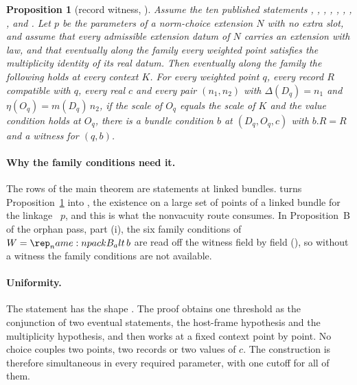 \documentclass[11pt]{article}
\newtheorem{proposition}[theorem]{Proposition}
\theoremstyle{remark}
\begin{document}
\begin{proposition}[record witness, ]\label{prop:bw}
Assume the ten published statements , , , , , , , ,  and . Let $p$ be the parameters of a norm-choice extension $N$ with no extra slot, and assume that every admissible extension datum of $N$ carries an extension with law, and that eventually along the family every weighted point satisfies the multiplicity identity  of its real datum. Then eventually along the family the following holds at every context $K$. For every weighted point $q$, every record $R$ compatible with $q$, every real $c$ and every pair $(n_1,n_2)$ with $\Delta(D_q)=n_1$ and $\eta(O_q)=m(D_q)\,n_2$, if the scale of $O_q$ equals the scale of $K$ and the value condition  holds at $O_q$, there is a bundle condition $b$ at $(D_q,O_q,c)$ with $b.R=R$ and a witness for $(q,b)$.
\end{proposition}

\paragraph{Why the family conditions need it.} The rows of the main theorem are statements at linked bundles.  turns Proposition~\ref{prop:bw} into , the existence on a large set of points of a linked bundle for the linkage ~$p$, and this is what the nonvacuity route consumes. In Proposition~B of the orphan pass, part (i), the six family conditions of $W=\lean{packB_alt}\,b$ are read off the witness field by field (), so without a witness the family conditions are not available.

\paragraph{Uniformity.} The statement has the shape . The proof obtains one threshold as the conjunction of two eventual statements, the host-frame hypothesis  and the multiplicity hypothesis, and then works at a fixed context point by point. No choice couples two points, two records or two values of $c$. The construction is therefore simultaneous in every required parameter, with one cutoff for all of them.
\end{document}
